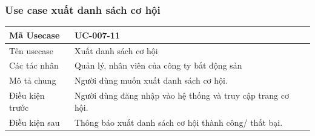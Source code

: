 \documentclass[12pt,a4paper]{article}
\begin{document}

    \subsubsection*{Use case xuất danh sách cơ hội}
    \begin{table}[H]
        \centering
        \begin{tabular}{|p{3.5cm}|p{11.5cm}|c|}
            \hline
            Mã Usecase      & UC-007-11                                                   \\
            \hline
            Tên usecase     & Xuất danh sách cơ hội                                       \\
            \hline
            Các tác nhân    & Quản lý, nhân viên của công ty bất động sản                 \\
            \hline
            Mô tả chung     & Người dùng muốn xuất danh sách cơ hội.                      \\
            \hline

            Điều kiện trước & Người dùng đăng nhập vào hệ thống và truy cập trang cơ hội. \\
            \hline

            Điều kiện sau   & Thông báo xuất danh sách cơ hội thành công/ thất bại.       \\
            \hline


\end{tabular}
\end{table}
\end{document}
